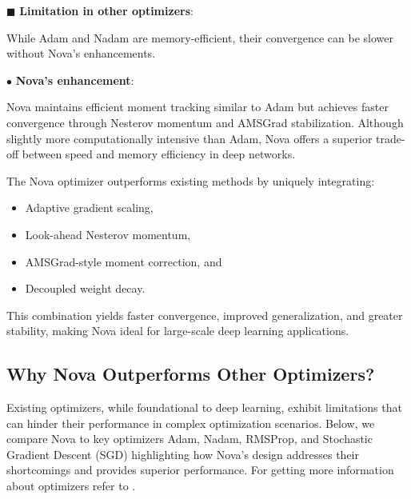 \documentclass{article}
\begin{document}
\begin{enumerate}
$\blacksquare$ \textbf{Limitation in other optimizers}:

While Adam and Nadam are memory-efficient, their convergence can be slower without Nova’s enhancements.

$\bullet$ \textbf{Nova’s enhancement}:

Nova maintains efficient moment tracking similar to Adam but achieves faster convergence through Nesterov momentum and AMSGrad stabilization. Although slightly more computationally intensive than Adam, Nova offers a superior trade-off between speed and memory efficiency in deep networks.


\end{enumerate}



The Nova optimizer outperforms existing methods by uniquely integrating:
\begin{itemize}
    \item Adaptive gradient scaling,
    \item Look-ahead Nesterov momentum,
    \item AMSGrad-style moment correction, and
    \item Decoupled weight decay.
\end{itemize}
This combination yields faster convergence, improved generalization, and greater stability, making Nova ideal for large-scale deep learning applications.












\subsection{Why Nova Outperforms Other Optimizers?}

Existing optimizers, while foundational to deep learning, exhibit limitations that can hinder their performance in complex optimization scenarios. Below, we compare Nova to key optimizers Adam, Nadam, RMSProp, and Stochastic Gradient Descent (SGD) highlighting how Nova’s design addresses their shortcomings and provides superior performance. For getting more information about optimizers refer to \cite{A1, A2, A3, A4, A6}.
\end{document}
